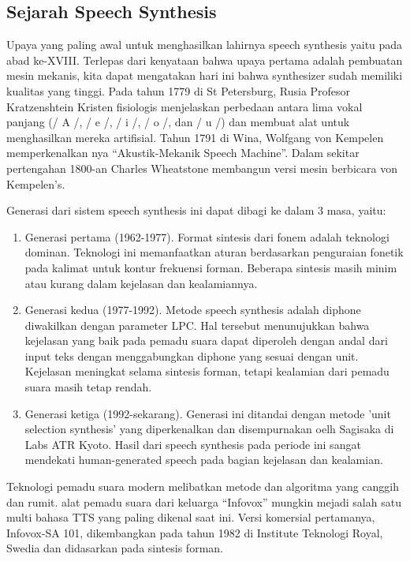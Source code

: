 \subsection{Sejarah Speech Synthesis}
Upaya yang paling awal untuk menghasilkan lahirnya speech synthesis yaitu pada abad ke-XVIII. Terlepas dari kenyataan bahwa upaya pertama adalah pembuatan mesin mekanis, kita dapat mengatakan hari ini  bahwa synthesizer sudah memiliki kualitas yang tinggi. Pada tahun 1779 di St Petersburg, Rusia Profesor Kratzenshtein Kristen fisiologis menjelaskan perbedaan antara lima vokal panjang  (/ A /, / e /, / i /, / o /, dan / u /) dan membuat alat untuk menghasilkan mereka artifisial. Tahun 1791 di Wina, Wolfgang von Kempelen memperkenalkan nya “Akustik-Mekanik Speech Machine”. Dalam sekitar pertengahan 1800-an Charles Wheatstone membangun versi mesin berbicara von Kempelen’s.

Generasi dari sistem speech synthesis ini dapat dibagi ke dalam 3 masa, yaitu:

\begin{enumerate}
\item Generasi pertama (1962-1977). Format sintesis dari fonem adalah teknologi dominan. Teknologi ini memanfaatkan aturan berdasarkan penguraian fonetik pada kalimat untuk kontur frekuensi forman. Beberapa sintesis masih minim atau kurang dalam kejelasan dan kealamiannya.
\item Generasi kedua (1977-1992). Metode speech synthesis adalah diphone diwakilkan dengan parameter LPC. Hal tersebut menunujukkan bahwa kejelasan yang baik pada pemadu suara dapat diperoleh dengan andal dari input teks dengan menggabungkan diphone yang sesuai dengan unit. Kejelasan meningkat selama sintesis forman, tetapi kealamian dari pemadu suara masih tetap rendah.
\item Generasi ketiga (1992-sekarang). Generasi ini ditandai dengan metode 'unit selection synthesis' yang diperkenalkan dan disempurnakan oelh Sagisaka di Labs ATR Kyoto. Hasil dari speech synthesis pada periode ini sangat mendekati human-generated speech pada bagian kejelasan dan kealamian.
\end{enumerate}

Teknologi pemadu suara modern melibatkan metode dan algoritma yang canggih dan rumit. alat pemadu suara dari keluarga “Infovox” mungkin mejadi salah satu multi bahasa TTS yang paling dikenal saat ini. Versi komersial pertamanya, Infovox-SA 101, dikembangkan pada tahun 1982 di Institute Teknologi Royal, Swedia dan didasarkan pada sintesis forman.

